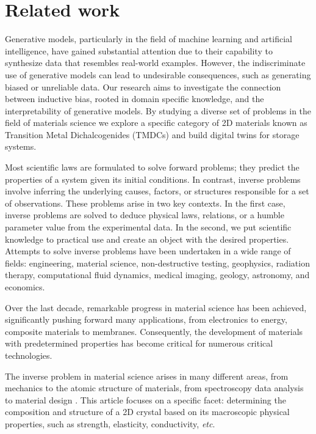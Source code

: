 \section{Related work}
Generative models, particularly in the field of machine learning and artificial intelligence, have gained substantial attention due to their capability to synthesize data that resembles real-world examples. However, the indiscriminate use of generative models can lead to undesirable consequences, such as generating biased or unreliable data. Our research aims to investigate the connection between inductive bias, rooted in domain specific knowledge, and the interpretability of generative models. By studying a diverse set of problems in the field of materials science we explore a specific category of 2D materials known as Transition Metal Dichalcogenides (TMDCs) and build digital twins for storage systems.

Most scientific laws are formulated to solve forward problems; they predict the properties of a system given its initial conditions. In contrast, inverse problems involve inferring the underlying causes, factors, or structures responsible for a set of observations. These problems arise in two key contexts. In the first case,  inverse problems are solved to deduce physical laws, relations, or a humble parameter value from the experimental data. In the second, we put scientific knowledge to practical use and create an object with the desired properties. Attempts to solve inverse problems have been undertaken in a wide range of fields: engineering, material science, non-destructive testing, geophysics, radiation therapy, computational fluid dynamics, medical imaging, geology, astronomy, and economics.

Over the last decade, remarkable progress in material science has been achieved, significantly pushing forward many applications, from electronics to energy, composite materials to membranes. Consequently, the development of materials with predetermined properties has become critical for numerous critical technologies.

The inverse problem in material science arises in many different areas, from mechanics to the atomic structure of materials, from spectroscopy data analysis to material design \cite{Lionheart2007Analysis, molesky2018inverse, zunger2018inverse, long2021constrained, Ren2021Invertible}. This article focuses on a specific facet: determining the composition and structure of a 2D crystal based on its macroscopic physical properties, such as strength, elasticity, conductivity, \emph{etc}.


